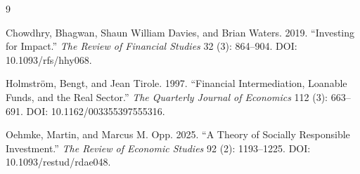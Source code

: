 \documentclass[12pt]{article}
\begin{document}
\newpage
\begin{thebibliography}{9}

Chowdhry, Bhagwan, Shaun William Davies, and Brian Waters. 2019.
``Investing for Impact.''
\textit{The Review of Financial Studies} 32 (3): 864--904.
DOI: 10.1093/rfs/hhy068.


Holmstr\"om, Bengt, and Jean Tirole. 1997.
``Financial Intermediation, Loanable Funds, and the Real Sector.''
\textit{The Quarterly Journal of Economics} 112 (3): 663--691.
DOI: 10.1162/003355397555316.

Oehmke, Martin, and Marcus M. Opp. 2025.
``A Theory of Socially Responsible Investment.''
\textit{The Review of Economic Studies} 92 (2): 1193--1225.
DOI: 10.1093/restud/rdae048.

\end{thebibliography}
\end{document}
